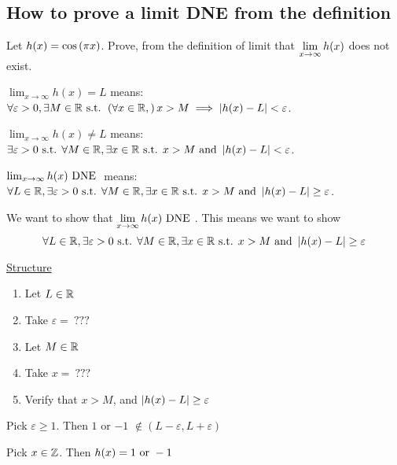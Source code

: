 \subsection{How to prove a limit DNE from the definition}

Let \(h(x) = \cos\left(\pi x\right)\). Prove, from the definition of limit that \(\displaystyle \lim_{x \to \infty} h(x)\) does not exist.


\(\lim_{x \to \infty} h(x) = L\) means: \(\forall \varepsilon > 0, \exists M \in \mathbb{R} \text{ s.t. } \left(\forall x \in \mathbb{R},\right) x > M \implies \left|h(x) - L\right| < \varepsilon\).

\(\lim_{x \to \infty} h(x) \neq L\) means: \(\exists \varepsilon > 0\text{ s.t. } \forall M \in \mathbb{R}, \exists x \in \mathbb{R} \text{ s.t. } x > M \text{ and } \left|h(x) - L\right| < \varepsilon\).

\(\lim_{x \to \infty} h(x) \text{ DNE }\) means: \(\forall L \in \mathbb{R}, \exists \varepsilon > 0 \text{ s.t. } \forall M \in \mathbb{R}, \exists x \in \mathbb{R} \text{ s.t. } x > M \text{ and } \left|h(x) - L\right| \geq \varepsilon\).

We want to show that \(\displaystyle \lim_{x \to \infty} h(x) \text{ DNE }\). This means we want to show \[\forall L \in \mathbb{R}, \exists \varepsilon > 0 \text{ s.t. } \forall M \in \mathbb{R}, \exists x \in \mathbb{R} \text{ s.t. } x > M \text{ and } \left|h(x) - L\right| \geq \varepsilon\]

\underline{Structure}
\begin{enumerate}
  \item Let \(L \in \mathbb{R}\)
  \item Take \(\varepsilon =~???\)
  \item Let \(M \in \mathbb{R}\)
  \item Take \(x =~???\)
        \item Verify that \(x > M\), and \(\left|h(x) - L\right| \geq \varepsilon\)
\end{enumerate}


Pick \(\varepsilon \geq 1\). Then \(1\) or \(-1\) \(\notin (L - \varepsilon, L + \varepsilon)\)

Pick \(x \in \mathbb{Z}\). Then \(h(x) = 1 \text{ or } -1\)

